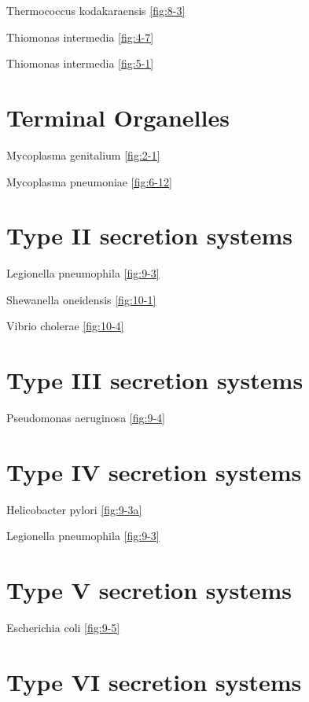 \documentclass[]{tufte-book}
\begin{document}
Thermococcus kodakaraensis \ref{fig:8-3}

Thiomonas intermedia \ref{fig:4-7}

Thiomonas intermedia \ref{fig:5-1}

\section*{Terminal Organelles}\label{terminal-organelles}

Mycoplasma genitalium \ref{fig:2-1}

Mycoplasma pneumoniae \ref{fig:6-12}

\section*{Type II secretion systems}\label{type-ii-secretion-systems}

Legionella pneumophila \ref{fig:9-3}

Shewanella oneidensis \ref{fig:10-1}

Vibrio cholerae \ref{fig:10-4}

\section*{Type III secretion systems}\label{type-iii-secretion-systems}

Pseudomonas aeruginosa \ref{fig:9-4}

\section*{Type IV secretion systems}\label{type-iv-secretion-systems}

Helicobacter pylori \ref{fig:9-3a}

Legionella pneumophila \ref{fig:9-3}

\section*{Type V secretion systems}\label{type-v-secretion-systems}

Escherichia coli \ref{fig:9-5}

\section*{Type VI secretion systems}\label{type-vi-secretion-systems}
\end{document}
